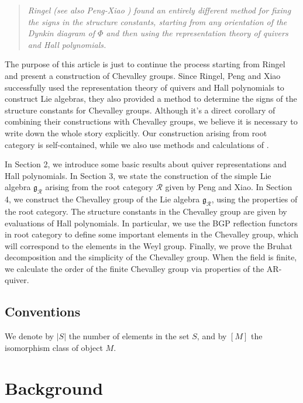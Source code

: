 \documentclass[12pt]{amsart}
\begin{document}
\begin{quote}
    \textit{Ringel \cite{RINGEL1990137} (see also Peng-Xiao \cite{1997ROOT}) found an entirely different method for fixing the signs in the structure constants, starting from any orientation of the Dynkin diagram of $\Phi$ and then using the representation theory of quivers and Hall polynomials.}
\end{quote}

The purpose of this article is just to continue the process starting from Ringel and present a construction of Chevalley groups.
Since Ringel, Peng and Xiao successfully used the representation theory of quivers and Hall polynomials to construct Lie algebras, they also provided a method to determine the signs of the structure constants for Chevalley groups.
Although it's a direct corollary of combining their constructions with Chevalley groups, we believe it is necessary to write down the whole story explicitly.
Our construction arising from root category is self-contained, while we also use methods and calculations of \cite{carter}.

In Section 2, we introduce some basic results about quiver representations and Hall polynomials.
In Section 3, we state the construction of the simple Lie algebra $\mathfrak{g}_{\mathcal{R}}$ arising from the root category $\mathcal{R}$ given by Peng and Xiao.
In Section 4, we construct the Chevalley group of the Lie algebra $\mathfrak{g}_{\mathcal{R}}$, using the properties of the root category.
The structure constants in the Chevalley group are given by evaluations of Hall polynomials.
In particular, we use the BGP reflection functors in root category\cite{BGP} to define some important elements in the Chevalley group, which will correspond to the elements in the Weyl group.
Finally, we prove the Bruhat decomposition and the simplicity of the Chevalley group.
When the field is finite, we calculate the order of the finite Chevalley group via properties of the AR-quiver.


\subsection*{Conventions}

We denote by $|S|$ the number of elements in the set $S$, and by $[M]$ the isomorphism class of object $M$.


\section{Background}
\end{document}
